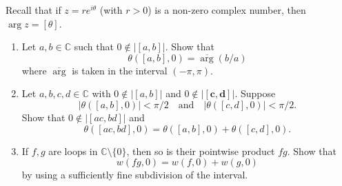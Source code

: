 \documentclass[12 pt, letterpaper]{hmcpset}
\begin{document}
\begin{problem}[30.]
	Recall that if $z = r e^{i \theta}$ (with $r > 0$) is a non-zero complex number, then $\operatorname{arg} z = [\theta]$.
	\begin{enumerate}
		\item Let $a, b \in \mathbb{C}$ such that $0 \notin \lvert [{a}, {b}] \rvert$. Show that
			\[
				\theta([{a}, {b}], 0) = \overline{\operatorname{arg}}(b / a)
			\]
			where $\overline{\operatorname{arg}}$ is taken in the interval $(-\pi, \pi)$.
		\item Let $a, b, c, d \in \mathbb{C}$ with $0 \notin \lvert [{a}, {b}] \rvert$ and $0 \notin \lvert [\mathbf{c}, \mathbf{d}] \rvert$. Suppose
			\[
				\lvert \theta([a, b], 0) \rvert < \pi / 2 \quad \text{and} \quad \lvert \theta([c, d], 0) \rvert < \pi / 2.
			\]
			Show that $0 \notin \lvert [ac, bd] \rvert$ and
			\[
				\theta([ac, bd], 0) = \theta([a, b], 0) + \theta([c, d], 0).
			\]
		\item If $f, g$ are loops in $\mathbb{C} \setminus \{ 0 \}$, then so is their pointwise product $fg$. Show that
			\[
				w(fg, 0) = w(f, 0) + w(g, 0)
			\]
			by using a sufficiently fine subdivision of the interval.
	\end{enumerate}	
\end{problem}
\end{document}
